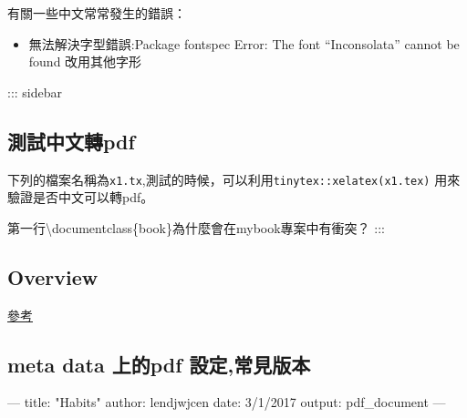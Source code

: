 \documentclass[]{book}
\newenvironment{Shaded}{\begin{snugshade}}{\end{snugshade}}
\newcommand{\KeywordTok}[1]{\textcolor[rgb]{0.13,0.29,0.53}{\textbf{#1}}}
\newcommand{\StringTok}[1]{\textcolor[rgb]{0.31,0.60,0.02}{#1}}
\newcommand{\SpecialStringTok}[1]{\textcolor[rgb]{0.31,0.60,0.02}{#1}}
\newcommand{\CommentTok}[1]{\textcolor[rgb]{0.56,0.35,0.01}{\textit{#1}}}
\newcommand{\OtherTok}[1]{\textcolor[rgb]{0.56,0.35,0.01}{#1}}
\newcommand{\FunctionTok}[1]{\textcolor[rgb]{0.00,0.00,0.00}{#1}}
\newcommand{\BuiltInTok}[1]{#1}
\newcommand{\ExtensionTok}[1]{#1}
\newcommand{\AttributeTok}[1]{\textcolor[rgb]{0.77,0.63,0.00}{#1}}
\newcommand{\NormalTok}[1]{#1}
\providecommand{\tightlist}{%
  \setlength{\itemsep}{0pt}\setlength{\parskip}{0pt}}
\theoremstyle{definition}
\theoremstyle{definition}
\theoremstyle{definition}
\theoremstyle{remark}
\begin{document}
有關一些中文常常發生的錯誤：

\begin{itemize}
\tightlist
\item
  無法解決字型錯誤:Package fontspec Error: The font ``Inconsolata''
  cannot be found 改用其他字形
\end{itemize}

::: sidebar

\subsection{測試中文轉pdf}\label{pdf}

下列的檔案名稱為\texttt{x1.tx},測試的時候，可以利用\texttt{tinytex::xelatex(x1.tex)}
用來驗證是否中文可以轉pdf。

\begin{Shaded}
\end{Shaded}

第一行\textbackslash{}documentclass\{book\}為什麼會在mybook專案中有衝突？
:::

\subsection{Overview}\label{overview}

\href{https://rmarkdown.rstudio.com/pdf_document_format}{參考}

\subsection{meta data 上的pdf 設定,常見版本}\label{meta-data-pdf-}

\begin{Shaded}
\begin{Highlighting}[]
\OtherTok{---}
\FunctionTok{title:}\AttributeTok{ }\StringTok{"Habits"}
\FunctionTok{author:}\AttributeTok{ lendjwjcen }
\FunctionTok{date:}\AttributeTok{ 3/1/2017}
\FunctionTok{output:}\AttributeTok{ pdf_document}
\OtherTok{---}
\end{Highlighting}
\end{Shaded}
\end{document}
